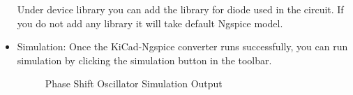 \begin{itemize}
Under device library you can add the library for diode used in the circuit. If you do not add any library it will take default Ngspice model.


\item Simulation: Once the KiCad-Ngspice converter runs successfully, you can run simulation by clicking the simulation button in the toolbar.
\begin{figure}[!htp]
    \centering
     \hfill
    \caption{Phase Shift Oscillator Simulation Output}
\end{figure}


\end{itemize}


